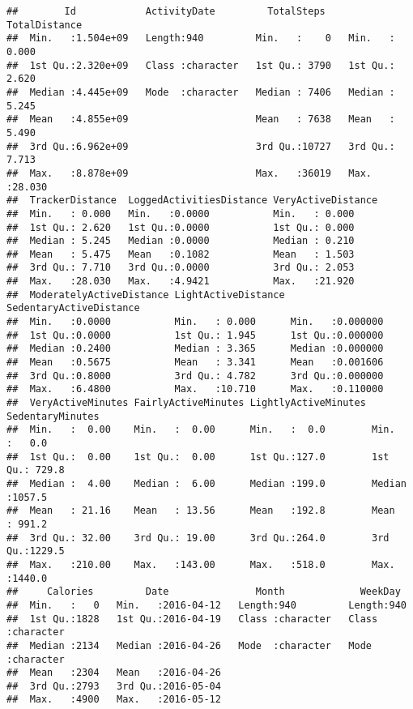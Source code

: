 \documentclass[
]{article}
\begin{document}
\begin{verbatim}
##        Id            ActivityDate         TotalSteps    TotalDistance   
##  Min.   :1.504e+09   Length:940         Min.   :    0   Min.   : 0.000  
##  1st Qu.:2.320e+09   Class :character   1st Qu.: 3790   1st Qu.: 2.620  
##  Median :4.445e+09   Mode  :character   Median : 7406   Median : 5.245  
##  Mean   :4.855e+09                      Mean   : 7638   Mean   : 5.490  
##  3rd Qu.:6.962e+09                      3rd Qu.:10727   3rd Qu.: 7.713  
##  Max.   :8.878e+09                      Max.   :36019   Max.   :28.030  
##  TrackerDistance  LoggedActivitiesDistance VeryActiveDistance
##  Min.   : 0.000   Min.   :0.0000           Min.   : 0.000    
##  1st Qu.: 2.620   1st Qu.:0.0000           1st Qu.: 0.000    
##  Median : 5.245   Median :0.0000           Median : 0.210    
##  Mean   : 5.475   Mean   :0.1082           Mean   : 1.503    
##  3rd Qu.: 7.710   3rd Qu.:0.0000           3rd Qu.: 2.053    
##  Max.   :28.030   Max.   :4.9421           Max.   :21.920    
##  ModeratelyActiveDistance LightActiveDistance SedentaryActiveDistance
##  Min.   :0.0000           Min.   : 0.000      Min.   :0.000000       
##  1st Qu.:0.0000           1st Qu.: 1.945      1st Qu.:0.000000       
##  Median :0.2400           Median : 3.365      Median :0.000000       
##  Mean   :0.5675           Mean   : 3.341      Mean   :0.001606       
##  3rd Qu.:0.8000           3rd Qu.: 4.782      3rd Qu.:0.000000       
##  Max.   :6.4800           Max.   :10.710      Max.   :0.110000       
##  VeryActiveMinutes FairlyActiveMinutes LightlyActiveMinutes SedentaryMinutes
##  Min.   :  0.00    Min.   :  0.00      Min.   :  0.0        Min.   :   0.0  
##  1st Qu.:  0.00    1st Qu.:  0.00      1st Qu.:127.0        1st Qu.: 729.8  
##  Median :  4.00    Median :  6.00      Median :199.0        Median :1057.5  
##  Mean   : 21.16    Mean   : 13.56      Mean   :192.8        Mean   : 991.2  
##  3rd Qu.: 32.00    3rd Qu.: 19.00      3rd Qu.:264.0        3rd Qu.:1229.5  
##  Max.   :210.00    Max.   :143.00      Max.   :518.0        Max.   :1440.0  
##     Calories         Date               Month             WeekDay         
##  Min.   :   0   Min.   :2016-04-12   Length:940         Length:940        
##  1st Qu.:1828   1st Qu.:2016-04-19   Class :character   Class :character  
##  Median :2134   Median :2016-04-26   Mode  :character   Mode  :character  
##  Mean   :2304   Mean   :2016-04-26                                        
##  3rd Qu.:2793   3rd Qu.:2016-05-04                                        
##  Max.   :4900   Max.   :2016-05-12
\end{verbatim}
\end{document}
